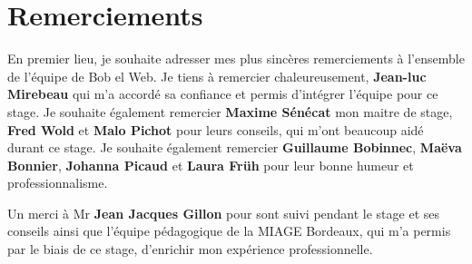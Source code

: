 

\chapter{Remerciements}

En premier lieu, je souhaite adresser mes plus sincères remerciements à l'ensemble de l'équipe de Bob el Web.
\jumpOne
Je tiens à remercier chaleureusement, \textbf{Jean-luc Mirebeau} qui m'a accordé sa confiance et permis d'intégrer l'équipe pour ce stage.
\jumpOne
Je souhaite également remercier \textbf{Maxime Sénécat} mon maitre de stage, \textbf{Fred Wold} et \textbf{Malo Pichot} pour leurs conseils, qui m'ont beaucoup aidé durant ce stage. 
\jumpOne
Je souhaite également remercier \textbf{Guillaume Bobinnec}, \textbf{Maëva Bonnier}, \textbf{Johanna Picaud} et \textbf{Laura Früh} pour leur bonne humeur et professionnalisme. 

Un merci à Mr \textbf{Jean Jacques Gillon} pour sont suivi pendant le stage et ses conseils ainsi que l'équipe pédagogique de la MIAGE Bordeaux, qui m'a permis par le biais de ce stage, d'enrichir mon expérience professionnelle.   



